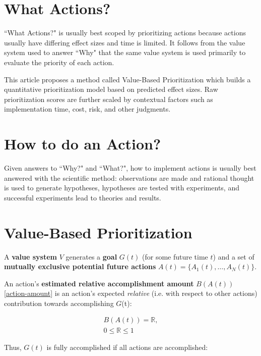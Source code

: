 \documentclass[12pt, a4paper, twocolumn]{article}
\begin{document}
\section{What Actions?}

``What Actions?" is usually best scoped by prioritizing actions because actions usually have differing effect sizes and time is limited. It follows from the value system used to answer ``Why" that the same value system is used primarily to evaluate the priority of each action.

This article proposes a method called Value-Based Prioritization which builds a quantitative prioritization model based on predicted effect sizes. Raw prioritization scores are further scaled by contextual factors such as implementation time, cost, risk, and other judgments.

\section{How to do an Action?}

Given answers to ``Why?" and ``What?", how to implement actions is usually best answered with the scientific method\cite{scientific-method}: observations are made and rational thought is used to generate hypotheses, hypotheses are tested with experiments, and successful experiments lead to theories and results.

\section{Value-Based Prioritization}

A \textbf{value system} $V$ generates a \textbf{goal} $G(t)$ (for some future time $t$) and a set of \textbf{mutually exclusive potential future actions} $A(t) = \{A_1(t), \ldots, A_N(t)\}$.

An action's \textbf{estimated relative accomplishment amount} $B(A(t))$ \eqref{action-amount} is an action's expected \textit{relative} (i.e. with respect to other actions) contribution towards accomplishing $G$(t):

\begin{equation}\label{action-amount}
  \begin{gathered}
B(A(t)) = \mathbb{R}, \\
0 \leq \mathbb{R} \leq 1
  \end{gathered}
\end{equation}

Thus, $G(t)$ is fully accomplished if all actions are accomplished:
\end{document}
